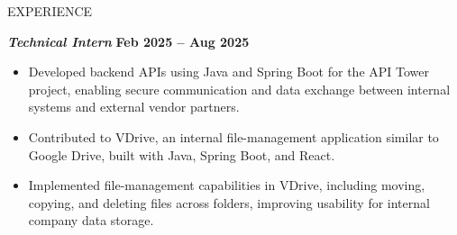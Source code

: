 \documentclass{resume}
\begin{document}
\begin{rSection}{EXPERIENCE}
\begin{itemize}
\end{itemize}

\textbf{\textit{Technical Intern}} \hfill \textbf{Feb 2025 -- Aug 2025}
\begin{itemize}
\itemsep -3pt {}
\item Developed backend APIs using Java and Spring Boot for the API Tower project, enabling secure communication and data exchange between internal systems and external vendor partners.
\item Contributed to VDrive, an internal file-management application similar to Google Drive, built with Java, Spring Boot, and React.
\item Implemented file-management capabilities in VDrive, including moving, copying, and deleting files across folders, improving usability for internal company data storage.
\end{itemize}

\end{rSection}

\end{document}
